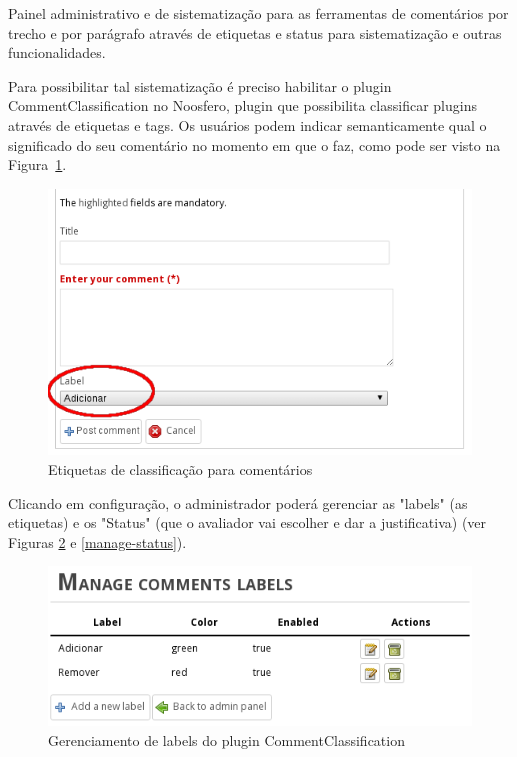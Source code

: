 \documentclass[12pt]{article}
\begin{document}
Painel administrativo e de sistematização para as ferramentas de comentários
por trecho e por parágrafo através de etiquetas e status para sistematização e
outras funcionalidades.

Para possibilitar tal sistematização é preciso habilitar o plugin
CommentClassification\cite{commentClassificationPlugin} no Noosfero, plugin
que possibilita classificar plugins através de etiquetas e tags. Os usuários
podem indicar semanticamente qual o significado do seu comentário no momento
em que o faz, como pode ser visto na Figura~\ref{etiqueta}.

\begin{figure}[h]
\center
\includegraphics[scale=0.5]{etiqueta.png}
\caption{Etiquetas de classificação para comentários}
\label{etiqueta}
\end{figure}

Clicando em configuração, o administrador poderá gerenciar as "labels" (as
etiquetas) e os "Status" (que o avaliador vai escolher e dar a justificativa)
(ver Figuras \ref{manage-labels} e \ref{manage-status}).

\begin{figure}[h]
\center
\includegraphics[scale=0.5]{manage-labels.png}
\caption{Gerenciamento de labels do plugin CommentClassification}
\label{manage-labels}
\end{figure}
\end{document}
